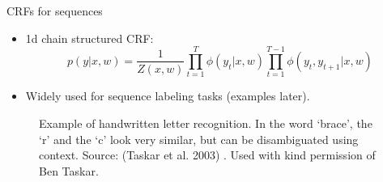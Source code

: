 \documentclass[10pt,mathserif]{beamer}
\begin{document}
\begin{frame}{CRFs for sequences}

\begin{itemize}
    \item 1d chain structured CRF:
    \begin{equation}
        p(y|x,w) = \frac{1}{Z(x,w)}\prod_{t=1}^T \phi(y_t|x,w)\prod_{t=1}^{T-1} \phi(y_t,y_{t+1}|x,w)
    \end{equation}
    \item Widely used for sequence labeling tasks (examples later).
\end{itemize}

\begin{figure}[h]
\centering     %
{}
\caption{Example of handwritten letter recognition. In the word `brace', the `r' and the `c' look very similar, but can be disambiguated using context. Source: (Taskar et al. 2003) . Used with kind permission of Ben Taskar.}
\end{figure}
\end{frame}
\end{document}
